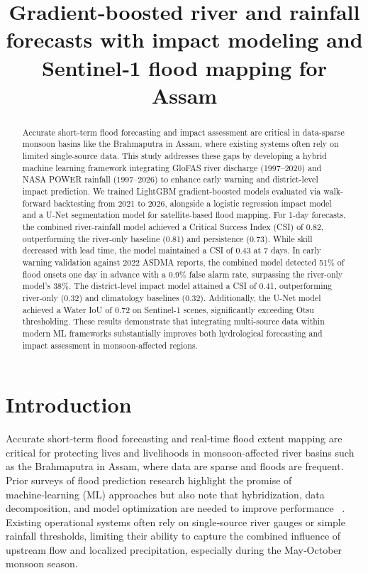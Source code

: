 \documentclass[conference]{IEEEtran}
\begin{document}
\title{Gradient-boosted river and rainfall forecasts with impact modeling and Sentinel‑1 flood mapping for Assam}
\author{}
\maketitle
\begin{abstract}Accurate short-term flood forecasting and impact assessment are critical in data-sparse monsoon basins like the Brahmaputra in Assam, where existing systems often rely on limited single-source data. This study addresses these gaps by developing a hybrid machine learning framework integrating GloFAS river discharge (1997–2020) and NASA POWER rainfall (1997–2026) to enhance early warning and district-level impact prediction. We trained LightGBM gradient-boosted models evaluated via walk-forward backtesting from 2021 to 2026, alongside a logistic regression impact model and a U-Net segmentation model for satellite-based flood mapping. For 1-day forecasts, the combined river-rainfall model achieved a Critical Success Index (CSI) of 0.82, outperforming the river-only baseline (0.81) and persistence (0.73). While skill decreased with lead time, the model maintained a CSI of 0.43 at 7 days. In early warning validation against 2022 ASDMA reports, the combined model detected 51\% of flood onsets one day in advance with a 0.9\% false alarm rate, surpassing the river-only model’s 38\%. The district-level impact model attained a CSI of 0.41, outperforming river-only (0.32) and climatology baselines (0.32). Additionally, the U-Net model achieved a Water IoU of 0.72 on Sentinel-1 scenes, significantly exceeding Otsu thresholding. These results demonstrate that integrating multi-source data within modern ML frameworks substantially improves both hydrological forecasting and impact assessment in monsoon-affected regions.\end{abstract}
\section{Introduction}
Accurate short‑term flood forecasting and real‑time flood extent mapping are critical for protecting lives and livelihoods in monsoon‑affected river basins such as the Brahmaputra in Assam, where data are sparse and floods are frequent. Prior surveys of flood prediction research highlight the promise of machine‑learning (ML) approaches but also note that hybridization, data decomposition, and model optimization are needed to improve performance ~\cite{mosavi2018c1,mohammadi2021c2,karim2023c3,noymanee2019c4,ghorpade2021c5,kumar2025c6}. Existing operational systems often rely on single‑source river gauges or simple rainfall thresholds, limiting their ability to capture the combined influence of upstream flow and localized precipitation, especially during the May‑October monsoon season.
\end{document}
